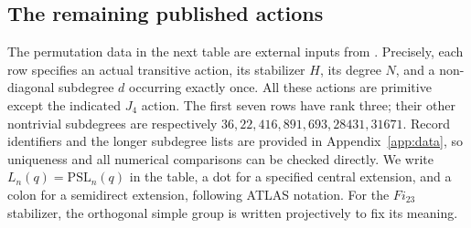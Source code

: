 \documentclass[11pt]{article}
\theoremstyle{definition}
\newcommand{\PSL}{\mathrm{PSL}}
\begin{document}
\subsection{The remaining published actions}
The permutation data in the next table are external inputs from \cite{Atlas,AtlasRep,PraegerSoicher,Muller,Mfer}. Precisely, each row specifies an actual transitive action, its stabilizer $H$, its degree $N$, and a non-diagonal subdegree $d$ occurring exactly once. All these actions are primitive except the indicated $J_4$ action. The first seven rows have rank three; their other nontrivial subdegrees are respectively $36,22,416,891,693,28431,31671$. Record identifiers and the longer subdegree lists are provided in Appendix~\ref{app:data}, so uniqueness and all numerical comparisons can be checked directly.
We write $L_n(q)=\PSL_n(q)$ in the table, a dot for a specified central extension, and a colon for a semidirect extension, following ATLAS notation. For the $Fi_{23}$ stabilizer, the orthogonal simple group is written projectively to fix its meaning.
\end{document}

